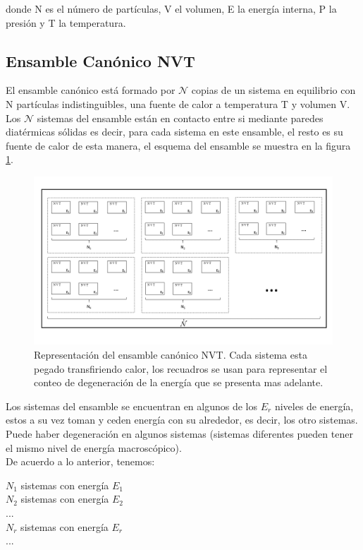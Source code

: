 donde N es el número de partículas, V el volumen, E la energía interna, P la presión y T la temperatura.

\subsection{Ensamble Canónico NVT}

El ensamble canónico está formado por $\mathcal{N}$ copias de un sistema en equilibrio con N partículas indistinguibles, una fuente de calor a temperatura T y volumen V. Los $\mathcal{N}$ sistemas del ensamble están en contacto entre si mediante paredes diatérmicas sólidas es decir, para cada sistema en este ensamble, el resto es su fuente de calor de esta manera, el esquema del ensamble se muestra en la figura \ref{fig:CanonicEns}.\\

\begin{figure}[!h]
    \centering
    \includegraphics[width=1\textwidth,keepaspectratio=true]{StatMech/nvtensemble.png}
    \caption{Representación del ensamble canónico NVT. Cada sistema esta pegado transfiriendo calor, los recuadros se usan para representar el conteo de degeneración de la energía que se presenta mas adelante.}
    \label{fig:CanonicEns}
\end{figure}

Los sistemas del ensamble se encuentran en algunos de los $E_r$ niveles de energía, estos a su vez toman y ceden energía con su alrededor, es decir, los otro sistemas. Puede haber degeneración en algunos sistemas (sistemas diferentes pueden tener el mismo nivel de energía macroscópico).\\

De acuerdo a lo anterior, tenemos:\\
\begin{center}
    $N_1$ sistemas con energía $E_1$\\
    $N_2$ sistemas con energía $E_2$\\
    ...\\
    $N_r$ sistemas con energía $E_r$\\
    ...\\
\end{center}

